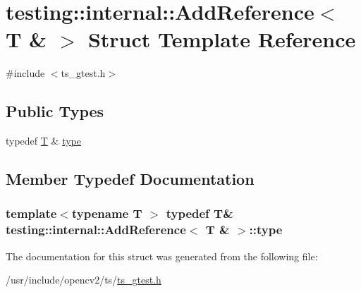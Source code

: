 \hypertarget{structtesting_1_1internal_1_1AddReference_3_01T_01_6_01_4}{\section{testing\-:\-:internal\-:\-:Add\-Reference$<$ T \& $>$ Struct Template Reference}
\label{structtesting_1_1internal_1_1AddReference_3_01T_01_6_01_4}
}


{\ttfamily \#include $<$ts\-\_\-gtest.\-h$>$}

\subsection*{Public Types}
\begin{DoxyCompactItemize}
\item 
typedef \hyperlink{calib3d_8hpp_a3efb9551a871ddd0463079a808916717}{T} \& \hyperlink{structtesting_1_1internal_1_1AddReference_3_01T_01_6_01_4_a93c064cdcdaced0abd167258425e57af}{type}
\end{DoxyCompactItemize}


\subsection{Member Typedef Documentation}
\hypertarget{structtesting_1_1internal_1_1AddReference_3_01T_01_6_01_4_a93c064cdcdaced0abd167258425e57af}{
\subsubsection[{type}]{\setlength{\rightskip}{0pt plus 5cm}template$<$typename T $>$ typedef {\bf T}\& {\bf testing\-::internal\-::\-Add\-Reference}$<$ {\bf T} \& $>$\-::{\bf type}}}\label{structtesting_1_1internal_1_1AddReference_3_01T_01_6_01_4_a93c064cdcdaced0abd167258425e57af}


The documentation for this struct was generated from the following file\-:\begin{DoxyCompactItemize}
\item 
/usr/include/opencv2/ts/\hyperlink{ts__gtest_8h}{ts\-\_\-gtest.\-h}\end{DoxyCompactItemize}

